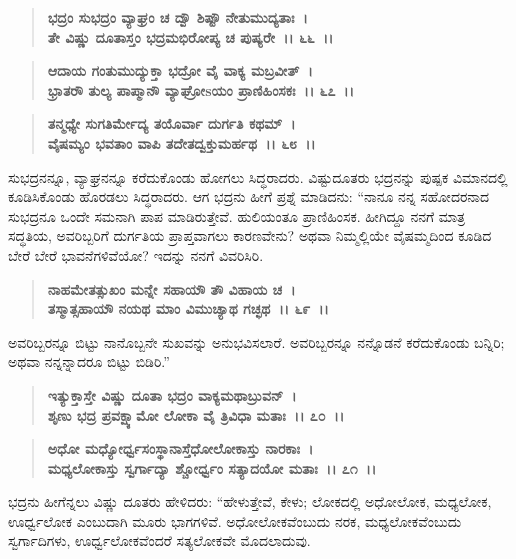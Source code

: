 \begin{verse}
\textbf{ಭದ್ರಂ ಸುಭದ್ರಂ ವ್ಯಾಘ್ರಂ ಚ ದ್ವೌ ಶಿಷ್ಟೌ ನೇತುಮುದ್ಯತಾಃ~।}\\\textbf{ತೇ ವಿಷ್ಣು ದೂತಾಸ್ತಂ ಭದ್ರಮಭಿರೋಪ್ಯ ಚ ಪುಷ್ಯರೇ~।। ೬೬~।। }
\end{verse}

\begin{verse}
\textbf{ಆದಾಯ ಗಂತುಮುದ್ಯುಕ್ತಾ ಭದ್ರೋ ವೈ ವಾಕ್ಯ ಮಬ್ರವೀತ್~।}\\\textbf{ಭ್ರಾತರೌ ತುಲ್ಯ ಪಾಪ್ಮಾನೌ ವ್ಯಾಘ್ರೋsಯಂ ಪ್ರಾಣಿಹಿಂಸಕಃ~।। ೬೭~।।} 
\end{verse}

\begin{verse}
\textbf{ತನ್ಮಧ್ಯೇ ಸುಗತಿರ್ಮೇದ್ಯ ತಯೊರ್ವಾ ದುರ್ಗತಿ ಕಥಮ್~।}\\\textbf{ವೈಷಮ್ಯಂ ಭವತಾಂ ವಾಪಿ ತದೇತದ್ವಕ್ತುಮರ್ಹಥ~।। ೬೮~।।}
\end{verse}

ಸುಭದ್ರನನ್ನೂ, ವ್ಯಾಘ್ರನನ್ನೂ ಕರೆದುಕೊಂಡು ಹೋಗಲು ಸಿದ್ಧರಾದರು. ವಿಷ್ಟುದೂತರು ಭದ್ರನನ್ನು ಪುಷ್ಪಕ ವಿಮಾನದಲ್ಲಿ ಕೂಡಿಸಿಕೊಂಡು ಹೊರಡಲು ಸಿದ್ಧರಾದರು. ಆಗ ಭದ್ರನು ಹೀಗೆ ಪ್ರಶ್ನೆ ಮಾಡಿದನು: “ನಾನೂ ನನ್ನ ಸಹೋದರನಾದ ಸುಭದ್ರನೂ ಒಂದೇ ಸಮನಾಗಿ ಪಾಪ ಮಾಡಿರುತ್ತೇವೆ. ಹುಲಿಯಂತೂ ಪ್ರಾಣಿಹಿಂಸಕ. ಹೀಗಿದ್ದೂ ನನಗೆ ಮಾತ್ರ ಸದ್ಧತಿಯ, ಅವರಿಬ್ಬರಿಗೆ ದುರ್ಗತಿಯ ಪ್ರಾಪ್ತವಾಗಲು ಕಾರಣವೇನು? ಅಥವಾ ನಿಮ್ಮಲ್ಲಿಯೇ ವೈಷಮ್ಮದಿಂದ ಕೂಡಿದ ಬೇರೆ ಬೇರೆ ಭಾವನೆಗಳಿವೆಯೋ? ಇದನ್ನು ನನಗೆ ವಿವರಿಸಿರಿ.

\begin{verse}
\textbf{ನಾಹಮೇತತ್ಸುಖಂ ಮನ್ನೇ ಸಹಾಯೌ ತೌ ವಿಹಾಯ ಚ~।}\\\textbf{ತಸ್ಮಾತ್ಸಹಾಯೌ ನಯಥ ಮಾಂ ವಿಮುಚ್ಯಾಥ ಗಚ್ಛಥ~।। ೬೯~।।}
\end{verse}

ಅವರಿಬ್ಬರನ್ನೂ ಬಿಟ್ಟು ನಾನೊಬ್ಬನೇ ಸುಖವನ್ನು ಅನುಭವಿಸಲಾರೆ. ಅವರಿಬ್ಬರನ್ನೂ ನನ್ನೊಡನೆ ಕರೆದುಕೊಂಡು ಬನ್ನಿರಿ; ಅಥವಾ ನನ್ನನ್ನಾದರೂ ಬಿಟ್ಟು ಬಿಡಿರಿ.”

\begin{verse}
\textbf{ಇತ್ಯುಕ್ತಾಸ್ತೇ ವಿಷ್ಣು ದೂತಾ ಭದ್ರಂ ವಾಕ್ಯಮಥಾಬ್ರುವನ್~।}\\\textbf{ಶೃಣು ಭದ್ರ ಪ್ರವಕ್ಷ್ಯಾಮೋ ಲೋಕಾ ವೈ ತ್ರಿವಿಧಾ ಮತಾಃ~।। ೭೦~।। }
\end{verse}

\begin{verse}
\textbf{ಅಧೋ ಮಧ್ಯೋರ್ಧ್ವಸಂಸ್ಥಾನಾಸ್ತೆಧೋಲೋಕಾಸ್ತು ನಾರಕಾಃ~।}\\\textbf{ಮಧ್ಯಲೋಕಾಸ್ತು ಸ್ವರ್ಗಾದ್ಯಾ ಶ್ಚೋರ್ಧ್ವಂ ಸತ್ಯಾದಯೋ ಮತಾಃ~।। ೭೧~।।}
\end{verse}

ಭದ್ರನು ಹೀಗೆನ್ನಲು ವಿಷ್ಣು ದೂತರು ಹೇಳಿದರು: “ಹೇಳುತ್ತೇವೆ, ಕೇಳು; ಲೋಕದಲ್ಲಿ ಅಧೋಲೋಕ, ಮಧ್ಯಲೋಕ, ಊರ್ಧ್ವಲೋಕ ಎಂಬುದಾಗಿ ಮೂರು ಭಾಗಗಳಿವೆ. ಅಧೋಲೋಕವೆಂಬುದು ನರಕ, ಮಧ್ಯಲೋಕವೆಂಬುದು ಸ್ವರ್ಗಾದಿಗಳು, ಊರ್ಧ್ವಲೋಕವೆಂದರೆ ಸತ್ಯಲೋಕವೇ ಮೊದಲಾದುವು.

